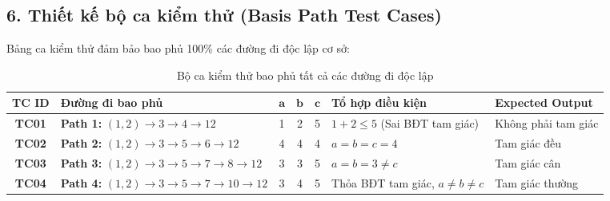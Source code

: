 \documentclass[11pt,a4paper]{article}
\begin{document}
\subsection*{6. Thiết kế bộ ca kiểm thử (Basis Path Test Cases)}

Bảng ca kiểm thử đảm bảo bao phủ 100\% các đường đi độc lập cơ sở:

\begin{table}[H]
\centering
\renewcommand{\arraystretch}{1.3}
\begin{tabularx}{\textwidth}{|c|L|c|c|c|L|L|}
\hline
{}
\textbf{TC ID} & \textbf{Đường đi bao phủ} & $\mathbf{a}$ & $\mathbf{b}$ & $\mathbf{c}$ & \textbf{Tổ hợp điều kiện} & \textbf{Expected Output} \\ \hline
\textbf{TC01} & \textbf{Path 1:} $(1,2) \to 3 \to 4 \to 12$ & 1 & 2 & 5 & $1 + 2 \le 5$ (Sai BĐT tam giác) & Không phải tam giác \\ \hline
\textbf{TC02} & \textbf{Path 2:} $(1,2) \to 3 \to 5 \to 6 \to 12$ & 4 & 4 & 4 & $a = b = c = 4$ & Tam giác đều \\ \hline
\textbf{TC03} & \textbf{Path 3:} $(1,2) \to 3 \to 5 \to 7 \to 8 \to 12$ & 3 & 3 & 5 & $a = b = 3 \ne c$ & Tam giác cân \\ \hline
\textbf{TC04} & \textbf{Path 4:} $(1,2) \to 3 \to 5 \to 7 \to 10 \to 12$ & 3 & 4 & 5 & Thỏa BĐT tam giác, $a \ne b \ne c$ & Tam giác thường \\ \hline
\end{tabularx}
\caption*{Bộ ca kiểm thử bao phủ tất cả các đường đi độc lập}
\end{table}
\end{document}
